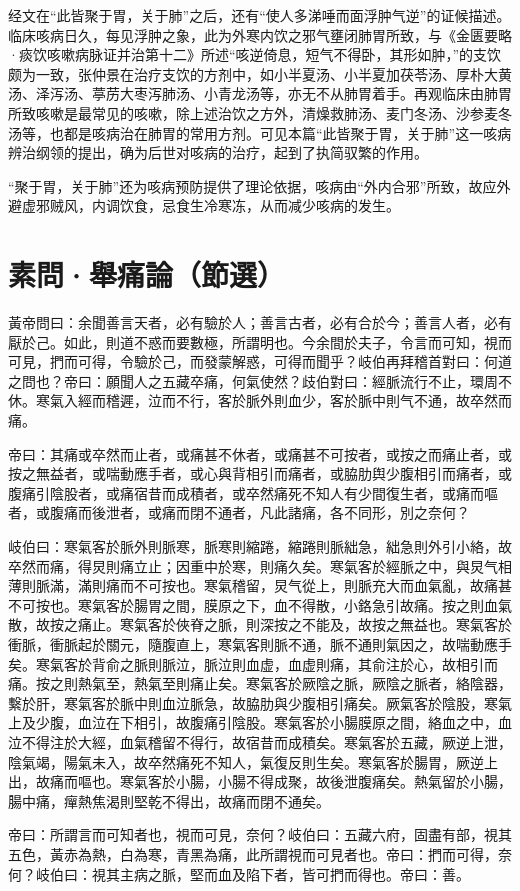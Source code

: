 \documentclass[draft,12pt]{ctexbook}
\begin{document}
经文在“此皆聚于胃，关于肺”之后，还有“使人多涕唾而面浮肿气逆”的证候描述。临床咳病日久，每见浮肿之象，此为外寒内饮之邪气壅闭肺胃所致，与《金匮要略·痰饮咳嗽病脉证并治第十二》所述“咳逆倚息，短气不得卧，其形如肿，”的支饮颇为一致，张仲景在治疗支饮的方剂中，如小半夏汤、小半夏加茯苓汤、厚朴大黄汤、泽泻汤、葶苈大枣泻肺汤、小青龙汤等，亦无不从肺胃着手。再观临床由肺胃所致咳嗽是最常见的咳嗽，除上述治饮之方外，清燥救肺汤、麦门冬汤、沙参麦冬汤等，也都是咳病治在肺胃的常用方剂。可见本篇“此皆聚于胃，关于肺”这一咳病辨治纲领的提出，确为后世对咳病的治疗，起到了执简驭繁的作用。

“聚于胃，关于肺”还为咳病预防提供了理论依据，咳病由“外内合邪”所致，故应外避虚邪贼风，内调饮食，忌食生冷寒冻，从而减少咳病的发生。

\section{素問·舉痛論（節選）}%


\begin{yuanwen}
黃帝問曰：余聞善言天者，必有驗於人；善言古者，必有合於今；善言人者，必有厭於己。如此，則道不惑而要數極，所謂明也。今余間於夫子，令言而可知，視而可見，捫而可得，令驗於己，而發蒙解惑，可得而聞乎？岐伯再拜稽首對曰：何道之問也？帝曰：願聞人之五藏卒痛，何氣使然？歧伯對曰：經脈流行不止，環周不休。寒氣入經而稽遲，泣而不行，客於脈外則血少，客於脈中則气不通，故卒然而痛。

帝曰：其痛或卒然而止者，或痛甚不休者，或痛甚不可按者，或按之而痛止者，或按之無益者，或喘動應手者，或心與背相引而痛者，或脇肋舆少腹相引而痛者，或腹痛引陰股者，或痛宿昔而成積者，或卒然痛死不知人有少間復生者，或痛而嘔者，或腹痛而後泄者，或痛而閉不通者，凡此諸痛，各不同形，別之奈何？

岐伯曰：寒氣客於脈外則脈寒，脈寒則縮踡，縮踡則脈絀急，絀急則外引小絡，故卒然而痛，得炅則痛立止；因重中於寒，則痛久矣。寒氣客於經脈之中，與炅气相薄則脈滿，滿則痛而不可按也。寒氣稽留，炅气從上，則脈充大而血氣亂，故痛甚不可按也。寒氣客於腸胃之間，膜原之下，血不得散，小鉻急引故痛。按之則血氣散，故按之痛止。寒氣客於俠脊之脈，則深按之不能及，故按之無益也。寒氣客於衝脈，衝脈起於關元，隨腹直上，寒氣客則脈不通，脈不通則氣因之，故喘動應手矣。寒氣客於背俞之脈則脈泣，脈泣則血虚，血虚則痛，其俞注於心，故相引而痛。按之則熱氣至，熱氣至則痛止矣。寒氣客於厥陰之脈，厥陰之脈者，絡陰器，繫於肝，寒氣客於脈中則血泣脈急，故脇肋與少腹相引痛矣。厥氣客於陰股，寒氣上及少腹，血泣在下相引，故腹痛引陰股。寒氣客於小腸膜原之間，絡血之中，血泣不得注於大經，血氣稽留不得行，故宿昔而成積矣。寒氣客於五藏，厥逆上泄，陰氣竭，陽氣未入，故卒然痛死不知人，氣復反則生矣。寒氣客於腸胃，厥逆上出，故痛而嘔也。寒氣客於小腸，小腸不得成聚，故後泄腹痛矣。熱氣留於小腸，腸中痛，癉熱焦渴則堅乾不得出，故痛而閉不通矣。

帝曰：所謂言而可知者也，視而可見，奈何？岐伯曰：五藏六府，固盡有部，視其五色，黃赤為熱，白為寒，青黑為痛，此所謂視而可見者也。帝曰：捫而可得，奈何？岐伯曰：視其主病之脈，堅而血及陷下者，皆可捫而得也。帝曰：善。
\end{yuanwen}
\end{document}
